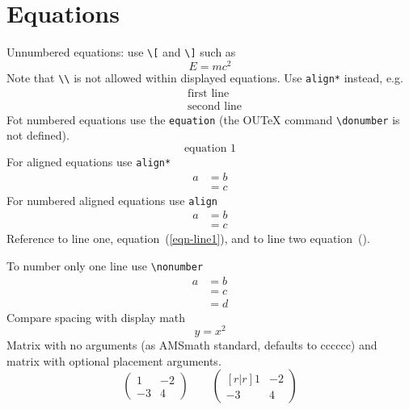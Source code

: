 \documentclass[solutionsatend,twocolumnsolutions]{ouunit}
\begin{document}
\section{Equations}
Unnumbered equations: use \verb"\[" and \verb"\]" such as
\[
E=mc^2
\]
Note that \verb"\\" is not allowed within displayed equations. Use \verb"align*" instead, e.g.
\begin{align*}
&\text{first line}\\
&\text{second line}
\end{align*}
Fot numbered equations use the \verb"equation" (the OUTeX command \verb"\donumber" is not defined).
\begin{equation}
\text{equation }1
\end{equation}
For aligned equations use \verb"align*"
\begin{align*}
a& =b\\
&=c
\end{align*}
For numbered aligned equations use \verb"align"
\begin{align}
a& =b\label{eqn-line1}\\
&=c\label{eqn-line2}
\end{align}
Reference to line one, equation~(\ref{eqn-line1}), and to line two equation~().

To number only one line use \verb"\nonumber"
\begin{align}
a& =b\nonumber\\
&=c\label{eqn-middle-line}\\
&=d\nonumber
\end{align}
Compare spacing with display math
\[
y=x^2
\]
Matrix with no arguments (as AMSmath standard, defaults to cccccc) and matrix with optional placement arguments.
\[
\begin{pmatrix}
1 & -2\\
-3 & 4
\end{pmatrix}
\qquad
\begin{pmatrix}[r|r]
1 & -2\\
-3 & 4
\end{pmatrix}
\]
\end{document}
